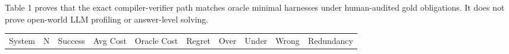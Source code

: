 \documentclass[
  10pt,
]{article}
\begin{document}
Table 1 proves that the exact compiler-verifier path matches oracle
minimal harnesses under human-audited gold obligations. It does not
prove open-world LLM profiling or answer-level solving.

\begin{longtable}[]{@{}
  >{\raggedright\arraybackslash}p{}
  >{\raggedleft\arraybackslash}p{}
  >{\raggedleft\arraybackslash}p{}
  >{\raggedleft\arraybackslash}p{}
  >{\raggedleft\arraybackslash}p{}
  >{\raggedleft\arraybackslash}p{}
  >{\raggedleft\arraybackslash}p{}
  >{\raggedleft\arraybackslash}p{}
  >{\raggedleft\arraybackslash}p{}
  >{\raggedleft\arraybackslash}p{}@{}}
\toprule\noalign{}
\begin{minipage}[b]{\linewidth}\raggedright
System
\end{minipage} & \begin{minipage}[b]{\linewidth}\raggedleft
N
\end{minipage} & \begin{minipage}[b]{\linewidth}\raggedleft
Success
\end{minipage} & \begin{minipage}[b]{\linewidth}\raggedleft
Avg Cost
\end{minipage} & \begin{minipage}[b]{\linewidth}\raggedleft
Oracle Cost
\end{minipage} & \begin{minipage}[b]{\linewidth}\raggedleft
Regret
\end{minipage} & \begin{minipage}[b]{\linewidth}\raggedleft
Over
\end{minipage} & \begin{minipage}[b]{\linewidth}\raggedleft
Under
\end{minipage} & \begin{minipage}[b]{\linewidth}\raggedleft
Wrong
\end{minipage} & \begin{minipage}[b]{\linewidth}\raggedleft
Redundancy
\end{minipage} \\

\end{longtable}
\end{document}
